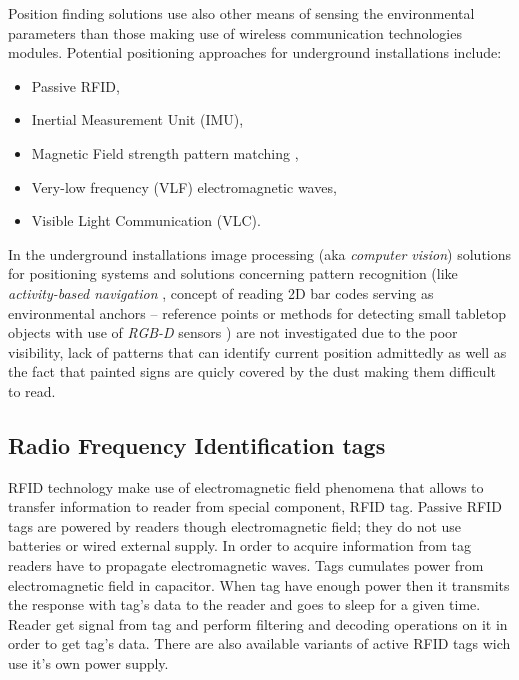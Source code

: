 \documentclass[../main.tex]{subfiles}
\begin{document}
Position finding solutions use also other means of sensing the environmental parameters than those making use of wireless communication technologies modules. Potential positioning approaches for underground installations include:
\begin{itemize}
	\item Passive RFID,
	\item Inertial Measurement Unit (IMU),
	\item Magnetic Field strength pattern matching \cite{article_geomagn_navi_mine},
	\item Very-low frequency (VLF) electromagnetic waves,
	\item Visible Light Communication (VLC).
\end{itemize}

In the underground installations image processing (aka \textit{computer vision}) solutions for positioning systems and solutions concerning pattern recognition (like \textit{activity-based navigation} \cite{article_visual_points_AR_navi}, concept of reading 2D bar codes serving as environmental anchors -- reference points \cite{article_inertial_test_smartphone} or methods for detecting small tabletop objects with use of \textit{RGB-D} sensors \cite{article_sensors_for_indoor_navi}) are not investigated due to the poor visibility, lack of patterns that can identify current position admittedly as well as the fact that painted signs are quicly covered by the dust making them difficult to read.


\subsection{Radio Frequency Identification tags} %
\label{sub:rfid_tags}

RFID technology make use of electromagnetic field phenomena that allows to transfer information to reader from special component, RFID tag. Passive RFID tags are powered by readers though electromagnetic field; they do not use batteries or wired external supply. In order to acquire information from tag readers have to propagate electromagnetic waves. Tags cumulates power from electromagnetic field in capacitor. When tag have enough power then it transmits the response with tag's data to the reader and goes to sleep for a given time. Reader get signal from tag and perform filtering and decoding operations on it in order to get tag's data. There are also available variants of active RFID tags wich use it's own power supply.
\end{document}
